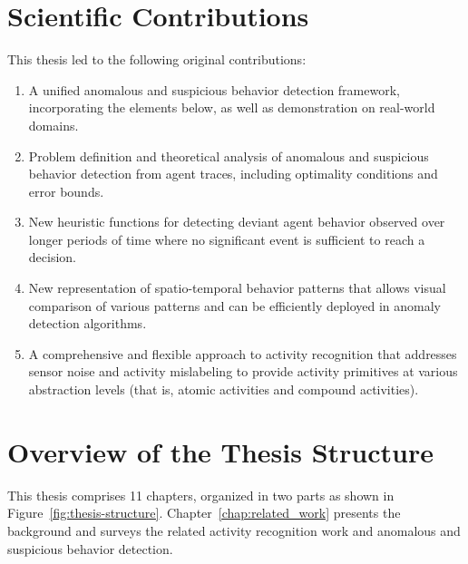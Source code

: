 %
%
\section{Scientific Contributions}

This thesis led to the following original contributions:

\begin{enumerate}

	\item A unified anomalous and suspicious behavior detection framework,  incorporating the elements below, as well as demonstration on real-world domains.

	\item Problem definition and theoretical analysis of anomalous and suspicious behavior detection from agent traces, including optimality conditions and error bounds.

	\item New heuristic functions for detecting deviant agent behavior observed over longer periods of time where no significant event is sufficient to reach a decision.

	\item New representation of spatio-temporal behavior patterns that allows visual comparison of various patterns and can be efficiently deployed in anomaly detection algorithms.

	\item A comprehensive and flexible approach to activity recognition that  addresses sensor noise and activity mislabeling to provide activity primitives at various abstraction levels (that is, atomic activities and compound activities).

\end{enumerate}



%
%
\section{Overview of the Thesis Structure}

This thesis comprises 11 chapters, organized in two parts as shown in Figure~\ref{fig:thesis-structure}. Chapter~\ref{chap:related_work} presents the background and surveys the related activity recognition work and anomalous and suspicious behavior detection. 

